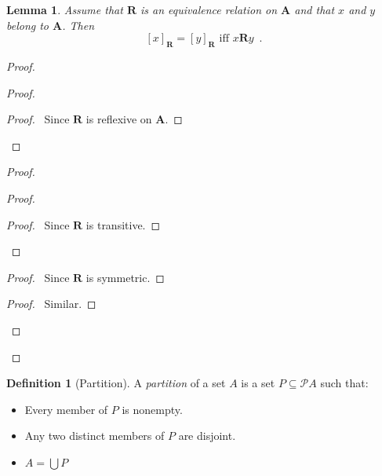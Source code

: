 \documentclass{report}
\let\qed\relax
\newtheorem{lemma}[axiom]{Lemma}
\theoremstyle{definition}
\newtheorem{definition}[axiom]{Definition}
\begin{document}
    \begin{lemma}
        Assume that $\mathbf{R}$ is an equivalence relation on $\mathbf{A}$ and that $x$ and $y$ belong to
        $\mathbf{A}$. Then
        \[ [x]_{\mathbf{R}} = [y]_{\mathbf{R}} \text{ iff } x \mathbf{R} y \enspace . \]
    \end{lemma}

    \begin{proof}
        \pf
        \begin{proof}
            \begin{proof}
                \pf\ Since $\mathbf{R}$ is reflexive on $\mathbf{A}$.
            \end{proof}
        \end{proof}
        \begin{proof}
            \begin{proof}
                \begin{proof}
                    \pf\ Since $\mathbf{R}$ is transitive.
                \end{proof}
            \end{proof}
            \begin{proof}
                \pf\ Since $\mathbf{R}$ is symmetric.
            \end{proof}
            \begin{proof}
                \pf\ Similar.
            \end{proof}
        \end{proof}
        \qed
    \end{proof}

    \begin{definition}[Partition]
        A \emph{partition} of a set $A$ is a set $P \subseteq \mathcal{P} A$ such that:
        \begin{itemize}
            \item Every member of $P$ is nonempty.
            \item Any two distinct members of $P$ are disjoint.
            \item $A = \bigcup P$
        \end{itemize}
    \end{definition}
\end{document}
